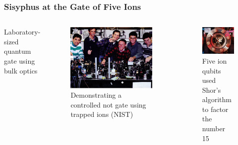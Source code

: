 \documentclass[handout]{beamer}
\begin{document}
\begin{frame}
  \frametitle{Sisyphus at the Gate of Five Ions}
  \begin{columns}
    Laboratory-sized quantum gate using bulk optics 
    \begin{figure}
      \centering
      \includegraphics[width=0.95\linewidth]{Graphics/nist_ionstorage1996.jpg}      
      \caption{Demonstrating a controlled not gate using trapped
        ions (NIST)~\cite{NIST-Q-Logic-Gates}}
    \end{figure}
    
    \begin{figure}
      \centering
    \includegraphics[width=0.95\linewidth]{Graphics/PW-2016-03-04-ion-trap-3-Shor15.jpg}
      
      \caption{Five ion qubits used Shor's algorithm to factor the number
        15~\cite{PW-Shor-factor-15}}
    \end{figure}
  \end{columns}

\end{frame}
\end{document}
